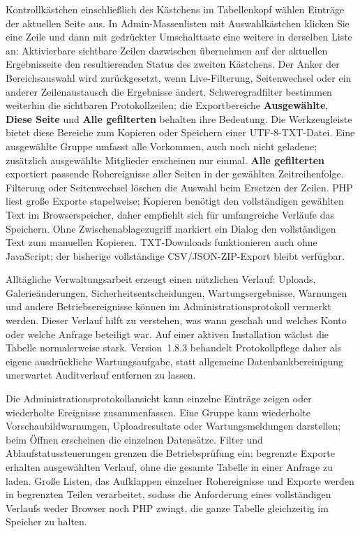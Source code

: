 \documentclass[11pt,a4paper]{article}
\newcommand{\version}{1.8.3}
\newcommand{\ui}[1]{\textbf{#1}}
\begin{document}
Kontrollkästchen einschließlich des Kästchens im Tabellenkopf wählen Einträge
der aktuellen Seite aus. In Admin-Massenlisten mit Auswahlkästchen klicken Sie
eine Zeile und dann mit gedrückter Umschalttaste eine weitere in derselben Liste
an: Aktivierbare sichtbare Zeilen dazwischen übernehmen auf der aktuellen
Ergebnisseite den resultierenden Status des zweiten Kästchens. Der Anker der
Bereichsauswahl wird zurückgesetzt, wenn Live-Filterung, Seitenwechsel oder ein
anderer Zeilenaustausch die Ergebnisse ändert. Schweregradfilter bestimmen
weiterhin die sichtbaren Protokollzeilen; die Exportbereiche \ui{Ausgewählte},
\ui{Diese Seite} und \ui{Alle gefilterten} behalten ihre Bedeutung. Die
Werkzeugleiste bietet diese Bereiche zum Kopieren oder Speichern einer
UTF-8-TXT-Datei. Eine ausgewählte Gruppe umfasst alle Vorkommen, auch noch nicht
geladene; zusätzlich ausgewählte Mitglieder erscheinen nur einmal. \ui{Alle
gefilterten} exportiert passende Rohereignisse aller Seiten in der gewählten
Zeitreihenfolge. Filterung oder Seitenwechsel löschen die Auswahl beim Ersetzen
der Zeilen. PHP liest große Exporte stapelweise; Kopieren benötigt den
vollständigen gewählten Text im Browserspeicher, daher empfiehlt sich für
umfangreiche Verläufe das Speichern. Ohne Zwischenablagezugriff markiert ein
Dialog den vollständigen Text zum manuellen Kopieren. TXT-Downloads
funktionieren auch ohne JavaScript; der bisherige vollständige
CSV/JSON-ZIP-Export bleibt verfügbar.

Alltägliche Verwaltungsarbeit erzeugt einen nützlichen Verlauf: Uploads,
Galerieänderungen, Sicherheitsentscheidungen, Wartungsergebnisse, Warnungen und
andere Betriebsereignisse können im Administrationsprotokoll vermerkt werden.
Dieser Verlauf hilft zu verstehen, was wann geschah und welches Konto oder
welche Anfrage beteiligt war. Auf einer aktiven Installation wächst die Tabelle
normalerweise stark. Version~\version{} behandelt Protokollpflege daher als
eigene ausdrückliche Wartungsaufgabe, statt allgemeine Datenbankbereinigung
unerwartet Auditverlauf entfernen zu lassen.

Die Administrationsprotokollansicht kann einzelne Einträge zeigen oder
wiederholte Ereignisse zusammenfassen. Eine Gruppe kann wiederholte
Vorschaubildwarnungen, Uploadresultate oder Wartungsmeldungen darstellen; beim
Öffnen erscheinen die einzelnen Datensätze. Filter und Ablaufstatussteuerungen
grenzen die Betriebsprüfung ein; begrenzte Exporte erhalten ausgewählten
Verlauf, ohne die gesamte Tabelle in einer Anfrage zu laden. Große Listen, das
Aufklappen einzelner Rohereignisse und Exporte werden in begrenzten Teilen
verarbeitet, sodass die Anforderung eines vollständigen Verlaufs weder Browser
noch PHP zwingt, die ganze Tabelle gleichzeitig im Speicher zu halten.
\end{document}
